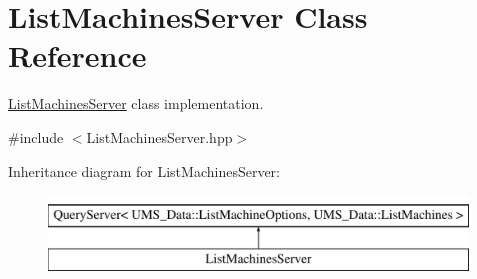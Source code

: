 \hypertarget{classListMachinesServer}{
\section{ListMachinesServer Class Reference}
\label{classListMachinesServer}
}


\hyperlink{classListMachinesServer}{ListMachinesServer} class implementation.  




{\ttfamily \#include $<$ListMachinesServer.hpp$>$}

Inheritance diagram for ListMachinesServer:\begin{figure}[H]
\begin{center}
\leavevmode
\includegraphics[height=2.000000cm]{classListMachinesServer}
\end{center}
\end{figure}
